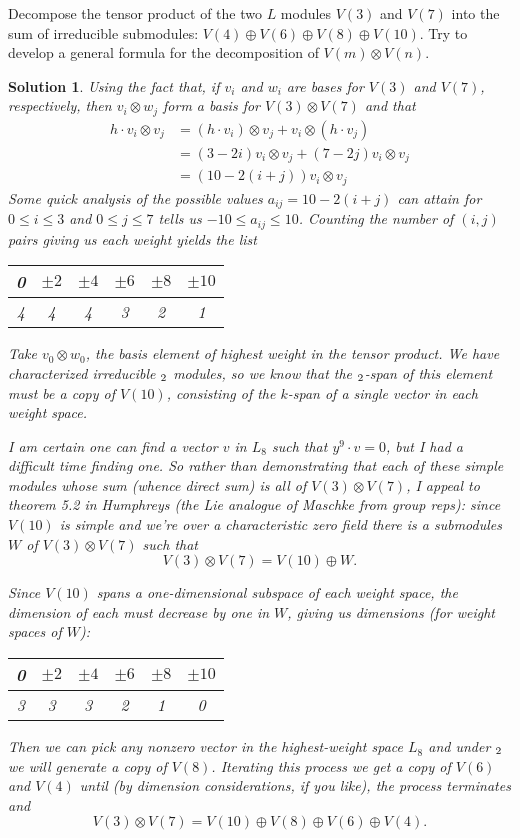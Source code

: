 \documentclass[12pt]{article}
\newenvironment{hwprob}[1]
{\renewcommand{\theprob}{#1}%
 \addtocounter{thm}{-1}%
 \begin{prob}}
{\end{prob}}
\theoremstyle{nonumberbreak}
\newtheorem{sol}{Solution}
\theoremstyle{changebreak}
\theoremstyle{nonumberbreak}
\theoremstyle{change}
\let\sl\relax
\DeclareMathOperator{\sl}{\mathfrak{sl}}
\begin{document}
\begin{hwprob}{7.6}
	Decompose the tensor product of the two $L$ modules $V(3)$ and $V(7)$ into the sum of irreducible submodules:
	$V(4)\oplus V(6)\oplus V(8)\oplus V(10)$. Try to develop a general formula for the decomposition of $V(m)\otimes V(n)$.
\end{hwprob}
\begin{sol}
	Using the fact that, if $v_i$ and $w_i$ are bases for $V(3)$ and $V(7)$, respectively, then $v_i\otimes w_j$ form a basis for $V(3)\otimes V(7)$ and that
	\begin{align*}
		h\cdot v_i\otimes v_j&=(h\cdot v_i)\otimes v_j+v_i\otimes(h\cdot v_j)\\
		&=(3-2i)v_i\otimes v_j+(7-2j)v_i\otimes v_j\\
		&=(10-2(i+j))v_i\otimes v_j
	\end{align*}
	Some quick analysis of the possible values $a_{ij}=10-2(i+j)$ can attain for $0\le i\le 3$ and $0\le j\le 7$
	tells us $-10\le a_{ij}\le 10$. Counting the number of $(i,j)$ pairs giving us each weight yields the list
	\begin{center}
		\begin{tabular}{c|c|c|c|c|c}
			0 & $\pm 2$ & $\pm 4$ & $\pm 6$ & $\pm 8$ & $\pm 10$\\\hline
			4 & 4 & 4 & 3 & 2 & 1
		\end{tabular}
	\end{center}

	Take $v_0\otimes w_0$, the basis element of highest weight in the tensor product. We have characterized irreducible $\sl_2$ modules,
	so we know that the $\sl_2$-span of this element must be a copy of $V(10)$, consisting of the $k$-span of a single vector in each weight space.
	
	I am certain one can find a vector $v$ in $L_8$ such that $y^9\cdot v=0$, but I had a difficult time finding one.
	So rather than demonstrating that each of these simple modules whose sum (whence direct sum) is all of $V(3)\otimes V(7)$, I appeal
	to theorem 5.2 in Humphreys (the Lie analogue of Maschke from group reps): since $V(10)$ is simple and we're over a characteristic zero field there is a submodules $W$ of $V(3)\otimes V(7)$ such that
	\[V(3)\otimes V(7)=V(10)\oplus W.\]
	
	Since $V(10)$ spans a one-dimensional subspace of each weight space, the dimension of each must decrease by one in $W$, giving us 
	dimensions (for weight spaces of $W$):
	\begin{center}
		\begin{tabular}{c|c|c|c|c|c}
			0 & $\pm 2$ & $\pm 4$ & $\pm 6$ & $\pm 8$ & $\pm 10$\\\hline
			3 & 3 & 3 & 2 & 1 & 0
		\end{tabular}
	\end{center}
	Then we can pick any nonzero vector in the highest-weight space $L_8$ and under $\sl_2$ we will generate a copy of $V(8)$.
	Iterating this process we get a copy of $V(6)$ and $V(4)$ until (by dimension considerations, if you like), the process terminates and
	\[V(3)\otimes V(7)=V(10)\oplus V(8)\oplus V(6)\oplus V(4).\]


\end{sol}
\end{document}
